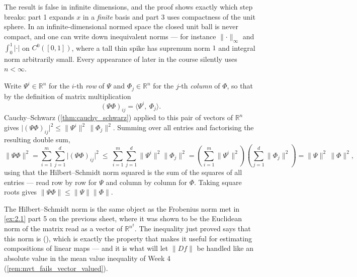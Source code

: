 \begin{exercisesolution}
\begin{remark}
\label{rem:norm_equivalence_needs_finite_dimension}
The result is false in infinite dimensions, and the proof shows exactly which step breaks: part 1
expands $x$ in a \emph{finite} basis and part 3 uses compactness of the unit sphere. In an
infinite-di\-men\-sional normed space the closed unit ball is never compact, and one can write
down inequivalent norms --- for instance $\lVert\cdot\rVert_\infty$ and
$\int_0^1|\cdot|$ on $C^0([0,1])$, where a tall thin spike has supremum norm $1$ and integral
norm arbitrarily small. Every appearance of  later
in the course silently uses $n < \infty$.
\end{remark}
\end{exercisesolution}

\begin{exercisesolution}
Write $\Psi^i \in \mathbb{R}^n$ for the $i$-th \emph{row} of $\Psi$ and
$\Phi_j \in \mathbb{R}^n$ for the $j$-th \emph{column} of $\Phi$, so that by the definition of
matrix multiplication
\[(\Psi\Phi)_{ij} = \langle \Psi^i,\ \Phi_j\rangle.\]
Cauchy--Schwarz (\cref{thm:cauchy_schwarz}) applied to this pair of vectors of $\mathbb{R}^n$
gives $\big|(\Psi\Phi)_{ij}\big|^2 \leq \lVert\Psi^i\rVert^2\,\lVert\Phi_j\rVert^2$. Summing over
all entries and factorising the resulting double sum,
\[\lVert\Psi\Phi\rVert^2
  = \sum_{i=1}^m\sum_{j=1}^d \big|(\Psi\Phi)_{ij}\big|^2
  \ \leq\ \sum_{i=1}^m\sum_{j=1}^d \lVert\Psi^i\rVert^2\lVert\Phi_j\rVert^2
  = \left(\sum_{i=1}^m\lVert\Psi^i\rVert^2\right)\left(\sum_{j=1}^d\lVert\Phi_j\rVert^2\right)
  = \lVert\Psi\rVert^2\,\lVert\Phi\rVert^2,\]
using that the Hilbert--Schmidt norm squared is the sum of the squares of all entries --- read
row by row for $\Psi$ and column by column for $\Phi$. Taking square roots gives
$\lVert\Psi\Phi\rVert \leq \lVert\Psi\rVert\lVert\Phi\rVert$.

\begin{ainote}
The Hilbert--Schmidt norm is the same object as the Frobenius norm met in
\cref{ex:2.1} part 5 on the previous sheet, where it was shown to be the Euclidean norm of the
matrix read as a vector of $\mathbb{R}^{n^2}$. The inequality just proved says that this norm is
 (), which is exactly the property that
makes it useful for estimating compositions of linear maps --- and it is what will let
$\lVert Df\rVert$ be handled like an absolute value in the mean value inequality of Week 4
(\cref{rem:mvt_fails_vector_valued}).
\end{ainote}
\end{exercisesolution}

